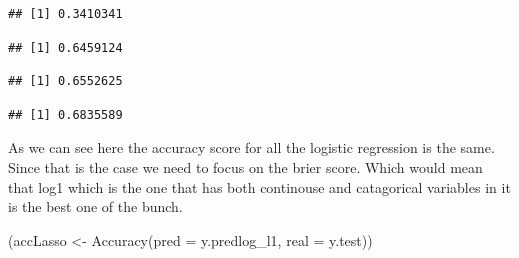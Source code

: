 \documentclass[
]{article}
\newenvironment{Shaded}{\begin{snugshade}}{\end{snugshade}}
\newcommand{\AttributeTok}[1]{\textcolor[rgb]{0.77,0.63,0.00}{#1}}
\newcommand{\CommentTok}[1]{\textcolor[rgb]{0.56,0.35,0.01}{\textit{#1}}}
\newcommand{\DecValTok}[1]{\textcolor[rgb]{0.00,0.00,0.81}{#1}}
\newcommand{\FunctionTok}[1]{\textcolor[rgb]{0.00,0.00,0.00}{#1}}
\newcommand{\NormalTok}[1]{#1}
\newcommand{\OtherTok}[1]{\textcolor[rgb]{0.56,0.35,0.01}{#1}}
\newcommand{\SpecialCharTok}[1]{\textcolor[rgb]{0.00,0.00,0.00}{#1}}
\begin{document}
\begin{verbatim}
## [1] 0.3410341
\end{verbatim}

\begin{Shaded}
\end{Shaded}

\begin{verbatim}
## [1] 0.6459124
\end{verbatim}

\begin{Shaded}
\end{Shaded}

\begin{verbatim}
## [1] 0.6552625
\end{verbatim}

\begin{Shaded}
\end{Shaded}

\begin{verbatim}
## [1] 0.6835589
\end{verbatim}

As we can see here the accuracy score for all the logistic regression is
the same. Since that is the case we need to focus on the brier score.
Which would mean that log1 which is the one that has both continouse and
catagorical variables in it is the best one of the bunch.

\begin{Shaded}
\begin{Highlighting}[]
\NormalTok{(accLasso }\OtherTok{\textless{}{-}} \FunctionTok{Accuracy}\NormalTok{(}\AttributeTok{pred =}\NormalTok{ y.predlog\_l1, }\AttributeTok{real =}\NormalTok{ y.test))}
\end{Highlighting}
\end{Shaded}
\end{document}

